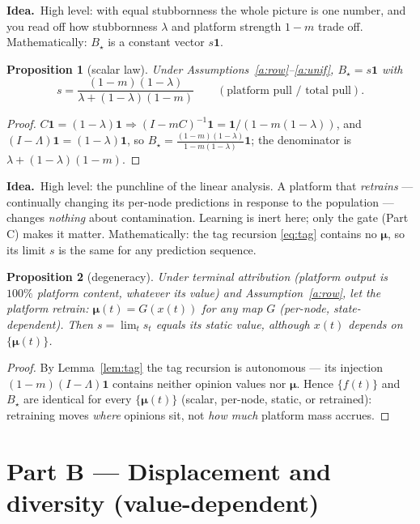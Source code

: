 \documentclass[11pt]{article}
\newtheorem{proposition}{Proposition}
\theoremstyle{definition}
\newcommand{\one}{\mathbf{1}}
\newcommand{\idea}[1]{\par\medskip\noindent\textbf{Idea.}\ #1\par\medskip}
\begin{document}
\idea{High level: with equal stubbornness the whole picture is one number, and you read
off how stubbornness $\lambda$ and platform strength $1-m$ trade off. Mathematically:
$B_\star$ is a constant vector $s\one$.}

\begin{proposition}[scalar law]\label{prop:scalar}
Under Assumptions~\ref{a:row}--\ref{a:unif}, $B_\star=s\one$ with
\begin{equation}\label{eq:s}
s=\frac{(1-m)(1-\lambda)}{\lambda+(1-\lambda)(1-m)}\qquad(\text{platform pull / total pull}).
\end{equation}
\end{proposition}
\begin{proof}
$C\one=(1-\lambda)\one\Rightarrow(I-mC)^{-1}\one=\one/(1-m(1-\lambda))$, and
$(I-\Lambda)\one=(1-\lambda)\one$, so $B_\star=\tfrac{(1-m)(1-\lambda)}{1-m(1-\lambda)}\one$;
the denominator is $\lambda+(1-\lambda)(1-m)$.
\end{proof}

\idea{High level: the punchline of the linear analysis. A platform that \emph{retrains}
--- continually changing its per-node predictions in response to the population ---
changes \emph{nothing} about contamination. Learning is inert here; only the gate
(Part C) makes it matter. Mathematically: the tag recursion \eqref{eq:tag} contains no
$\bm{\mu}$, so its limit $s$ is the same for any prediction sequence.}

\begin{proposition}[degeneracy]\label{prop:degen}
Under terminal attribution (platform output is $100\%$ platform content, whatever its
value) and Assumption~\ref{a:row}, let the platform retrain: $\bm{\mu}(t)=G(x(t))$ for
any map $G$ \textup{(per-node, state-dependent)}. Then $s=\lim_t s_t$ equals its static
value, although $x(t)$ depends on $\{\bm{\mu}(t)\}$.
\end{proposition}
\begin{proof}
By Lemma~\ref{lem:tag} the tag recursion is autonomous --- its injection $(1-m)(I-\Lambda)\one$
contains neither opinion values nor $\bm{\mu}$. Hence $\{f(t)\}$ and $B_\star$ are
identical for every $\{\bm{\mu}(t)\}$ (scalar, per-node, static, or retrained):
retraining moves \emph{where} opinions sit, not \emph{how much} platform mass accrues.
\end{proof}

\section{Part B --- Displacement and diversity (value-dependent)}
\end{document}
